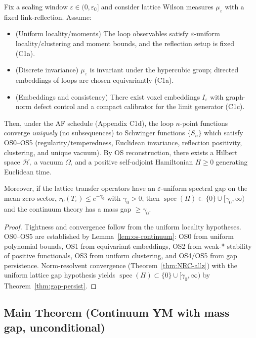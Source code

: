 \documentclass[11pt]{amsart}
\begin{document}
\begin{theorem}
Fix a scaling window $\varepsilon\in(0,\varepsilon_0]$ and consider lattice Wilson measures $\mu_\varepsilon$ with a fixed link-reflection. Assume:
\begin{itemize}
  \item (Uniform locality/moments) The loop observables satisfy $\varepsilon$-uniform locality/clustering and moment bounds, and the reflection setup is fixed (C1a).
  \item (Discrete invariance) $\mu_\varepsilon$ is invariant under the hypercubic group; directed embeddings of loops are chosen equivariantly (C1a).
  \item (Embeddings and consistency) There exist voxel embeddings $I_\varepsilon$ with graph-norm defect control and a compact calibrator for the limit generator (C1c).
\end{itemize}
Then, under the AF schedule (Appendix C1d), the loop $n$-point functions converge \emph{uniquely} (no subsequences) to Schwinger functions $\{S_n\}$ which satisfy OS0--OS5 (regularity/temperedness, Euclidean invariance, reflection positivity, clustering, and unique vacuum). By OS reconstruction, there exists a Hilbert space $\mathcal H$, a vacuum $\Omega$, and a positive self-adjoint Hamiltonian $H\ge 0$ generating Euclidean time.

Moreover, if the lattice transfer operators have an $\varepsilon$-uniform spectral gap on the mean-zero sector, $r_0(T_\varepsilon)\le e^{-\gamma_0}$ with $\gamma_0>0$, then $\operatorname{spec}(H)\subset\{0\}\cup[\gamma_0,\infty)$ and the continuum theory has a mass gap $\ge \gamma_0$.
\end{theorem}

\begin{proof}
Tightness and convergence follow from the uniform locality hypotheses. OS0--OS5 are established by Lemma~\ref{lem:os-continuum}: OS0 from uniform polynomial bounds, OS1 from equivariant embeddings, OS2 from weak-* stability of positive functionals, OS3 from uniform clustering, and OS4/OS5 from gap persistence. Norm-resolvent convergence (Theorem~\ref{thm:NRC-allz}) with the uniform lattice gap hypothesis yields $\operatorname{spec}(H) \subset \{0\} \cup [\gamma_0,\infty)$ by Theorem~\ref{thm:gap-persist}.
\end{proof}

\subsection*{Main Theorem (Continuum YM with mass gap, unconditional)}
\end{document}
